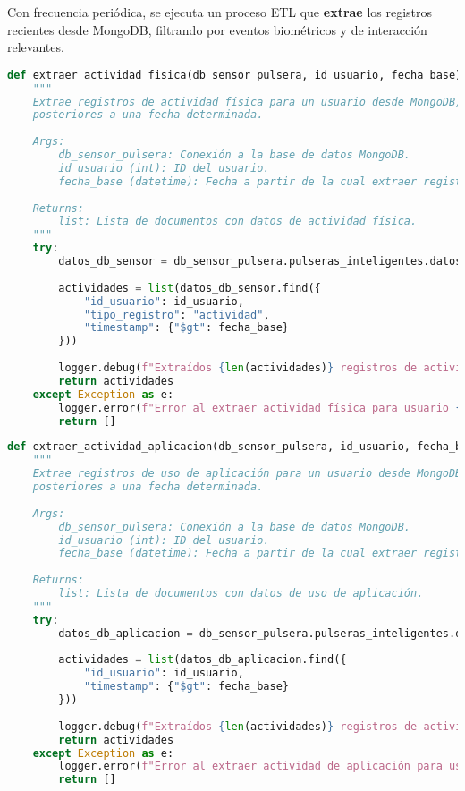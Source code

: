 Con frecuencia periódica, se ejecuta un proceso ETL que {\bfseries extrae} los registros recientes desde MongoDB, filtrando por eventos biométricos y de interacción relevantes.

\begin{lstlisting}[language=Python]
    def extraer_actividad_fisica(db_sensor_pulsera, id_usuario, fecha_base):
    """
    Extrae registros de actividad física para un usuario desde MongoDB,
    posteriores a una fecha determinada.
    
    Args:
        db_sensor_pulsera: Conexión a la base de datos MongoDB.
        id_usuario (int): ID del usuario.
        fecha_base (datetime): Fecha a partir de la cual extraer registros.
        
    Returns:
        list: Lista de documentos con datos de actividad física.
    """
    try:
        datos_db_sensor = db_sensor_pulsera.pulseras_inteligentes.datos_sensor
        
        actividades = list(datos_db_sensor.find({
            "id_usuario": id_usuario,
            "tipo_registro": "actividad", 
            "timestamp": {"$gt": fecha_base}
        }))
        
        logger.debug(f"Extraídos {len(actividades)} registros de actividad física para usuario {id_usuario}")
        return actividades
    except Exception as e:
        logger.error(f"Error al extraer actividad física para usuario {id_usuario}: {e}")
        return []
\end{lstlisting}

\begin{lstlisting}[language=Python]
    def extraer_actividad_aplicacion(db_sensor_pulsera, id_usuario, fecha_base):
    """
    Extrae registros de uso de aplicación para un usuario desde MongoDB,
    posteriores a una fecha determinada.
    
    Args:
        db_sensor_pulsera: Conexión a la base de datos MongoDB.
        id_usuario (int): ID del usuario.
        fecha_base (datetime): Fecha a partir de la cual extraer registros.
        
    Returns:
        list: Lista de documentos con datos de uso de aplicación.
    """
    try:
        datos_db_aplicacion = db_sensor_pulsera.pulseras_inteligentes.datos_aplicacion
        
        actividades = list(datos_db_aplicacion.find({
            "id_usuario": id_usuario,
            "timestamp": {"$gt": fecha_base}
        }))
        
        logger.debug(f"Extraídos {len(actividades)} registros de actividad de aplicación para usuario {id_usuario}")
        return actividades
    except Exception as e:
        logger.error(f"Error al extraer actividad de aplicación para usuario {id_usuario}: {e}")
        return []
\end{lstlisting}

